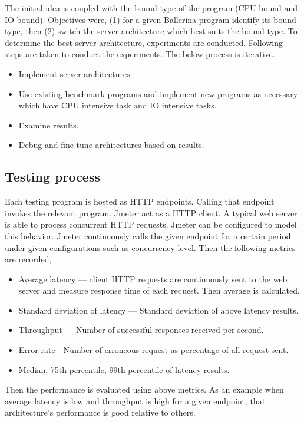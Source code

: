 The initial idea is coupled with the bound type of the program (CPU bound and IO-bound). Objectives were, (1) for a given Ballerina program identify its bound type, then (2) switch the server architecture which best suits the bound type. To determine the best server architecture, experiments are conducted. Following steps are taken to conduct the experiments. The below process is iterative.

\begin{itemize}
	\item Implement server architectures
	\item Use existing benchmark programs and implement new programs as necessary which have CPU intensive task and IO intensive tasks.
	\item Examine results.
	\item Debug and fine tune architectures based on results.
\end{itemize} 

\subsection{Testing process}

Each testing program is hosted as HTTP endpoints. Calling that endpoint invokes the relevant program. Jmeter act as a HTTP client. A typical web server is able to process concurrent HTTP requests. Jmeter can be configured to model this behavior. Jmeter continuously calls the given endpoint for a certain period under given configurations such as concurrency level. Then the following metrics are recorded,

\begin{itemize}
	\item Average latency — client HTTP requests are continuously sent to the web server and measure response time of each request. Then average is calculated.
	\item Standard deviation of latency — Standard deviation of above latency results.
	\item Throughput — Number of successful responses received per second.
	\item Error rate - Number of erroneous request as percentage of all request sent.
	\item Median, 75th percentile, 99th percentile of latency results.
\end{itemize} 

Then the performance is evaluated using above metrics. As an example when average latency is low and throughput is high for a given endpoint, that architecture's performance is good relative to others.
  

